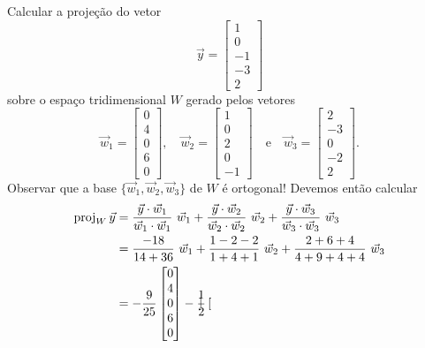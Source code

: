 \documentclass[../livro.tex]{subfiles}  %
\begin{document}
\begin{example}
Calcular a projeção do vetor
\begin{equation}
\vec{y} =
\begin{bmatrix}
1 \\ 0 \\ -1 \\ -3 \\ 2
\end{bmatrix}
\end{equation} sobre o espaço tridimensional $W$ gerado pelos vetores
\begin{equation}
\vec{w}_1 =
\begin{bmatrix}
 0\\4\\0 \\ 6 \\0
\end{bmatrix}, \quad
\vec{w}_2 =
\begin{bmatrix}
 1\\0\\2\\0\\-1
\end{bmatrix} \quad \text{e} \quad
\vec{w}_3 =
\begin{bmatrix}
 2\\-3\\0\\-2\\ 2
\end{bmatrix}.
\end{equation} Observar que a base $\{\vec{w}_1, \vec{w}_2, \vec{w}_3\}$ de $W$ é ortogonal! Devemos então calcular
  \begin{align*}
\proj_W \vec{y} & = \frac{\vec{y} \cdot \vec{w}_1}{\vec{w}_1 \cdot \vec{w}_1} \ \vec{w}_1 + \frac{\vec{y} \cdot \vec{w}_2}{\vec{w}_2 \cdot \vec{w}_2} \ \vec{w}_2 + \frac{\vec{y} \cdot \vec{w}_3}{\vec{w}_3 \cdot \vec{w}_3} \ \vec{w}_3\\
                & = \frac{ -18 }{ 14 + 36 } \ \vec{w}_1 + \frac{ 1 - 2 - 2 }{ 1 + 4 + 1 } \ \vec{w}_2 + \frac{ 2 + 6 + 4 }{ 4 + 9 + 4 + 4 } \ \vec{w}_3 \\
                & = -\frac{9}{25} \begin{bmatrix}
 0\\4\\0 \\ 6 \\0
\end{bmatrix} - \frac{1}{2} \begin{bmatrix}

\end{bmatrix}
\end{align*}
\end{example}
\end{document}
